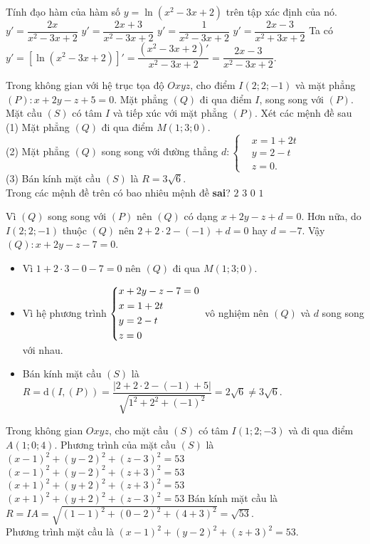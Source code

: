 \begin{ex}%
 Tính đạo hàm của hàm số $y=\ln\left(x^2-3x+2\right)$ trên tập xác định của nó.
 \choice
  {$y'=\dfrac{2x}{x^2-3x+2}$}
  {$y'=\dfrac{2x+3}{x^2-3x+2}$}
  {$y'=\dfrac{1}{x^2-3x+2}$}
  {\True $y'=\dfrac{2x-3}{x^2+3x+2}$}
 \loigiai
  {
  Ta có $y'=\left[\ln(x^2-3x+2)\right]'=\dfrac{(x^2-3x+2)'}{x^2-3x+2}=\dfrac{2x-3}{x^2-3x+2}$.
  }
\end{ex}

\begin{ex}%
 Trong không gian với hệ trục tọa độ $Oxyz$, cho điểm $I(2;2;-1)$ và mặt phẳng\break $(P)\colon x+2y-z+5=0$. Mặt phẳng $(Q)$ đi qua điểm $I$, song song với $(P)$. Mặt cầu $(S)$ có tâm $I$ và tiếp xúc với mặt phẳng $(P)$.  Xét các mệnh đề sau\\
 (1) Mặt phẳng $(Q)$ đi qua điểm $M(1;3;0)$. \\
 (2) Mặt phẳng $(Q)$ song song với đường thẳng $d\colon \left\{\begin{aligned}&x=1+2t \\&y=2-t \\&z=0.\end{aligned}\right.$\\
 (3) Bán kính mặt cầu $(S)$ là $R=3\sqrt{6}$.\\
 Trong các mệnh đề trên có bao nhiêu mệnh đề \textbf{sai}?
 \choice
  {$2$}
  {$3$}
  {$0$}
  {\True $1$}
 \loigiai
  {
  Vì $(Q)$ song song với $(P)$ nên $(Q)$ có dạng $x+2y-z+d=0$. Hơn nữa, do $I(2;2;-1)$ thuộc $(Q)$ nên $2+2\cdot2-(-1)+d=0$ hay $d=-7$. Vậy $(Q)\colon x+2y-z-7=0$.
  \begin{itemize}
 	\item Vì $1+2\cdot 3-0-7= 0$ nên $(Q)$ đi qua $M (1;3;0)$.
 	\item Vì hệ phương trình $\left\{\begin{aligned}&x+2y-z-7=0\\&x=1+2t \\&y=2-t \\&z=0\end{aligned}\right.$ vô nghiệm nên $(Q)$ và $d$ song song với nhau.
 	\item Bán kính mặt cầu $(S)$ là $R=\mathrm{d}(I,(P))=\dfrac{|2+2\cdot2-(-1)+5|}{\sqrt{1^2+2^2+(-1)^2}}=2\sqrt6\ne 3\sqrt 6$.
  \end{itemize}
  }
\end{ex}

\begin{ex}%
 Trong không gian $Oxyz$, cho mặt cầu $(S)$ có tâm $I(1;2;-3)$ và đi qua điểm $A(1;0;4)$. Phương trình của mặt cầu $(S)$ là
 \choice
  {$(x-1)^2+(y-2)^2+(z-3)^2=53$}
  {\True $(x-1)^2+(y-2)^2+(z+3)^2=53$}
  {$(x+1)^2+(y+2)^2+(z+3)^2=53$}
  {$(x+1)^2+(y+2)^2+(z-3)^2=53$}
 \loigiai
  {
  Bán kính mặt cầu là $R=IA=\sqrt{(1-1)^2+(0-2)^2+(4+3)^2}=\sqrt{53}$.\\
  Phương trình mặt cầu là $(x-1)^2+(y-2)^2+(z+3)^2=53$.
  }
\end{ex}

